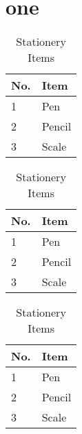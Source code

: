 \documentclass{article}
\begin{document}
	\tableofcontents
	\listoftables
	
	\section{one}
	\lipsum[1-2]
	
	\begin{table}
		\centering
		\begin{tabular}{|l|l|}
			\hline
			No. & Item\\
			\hline
			1 & Pen\\
			\hline
			2 & Pencil\\
			\hline
			3 & Scale\\
			\hline
		\end{tabular}
		\caption{Stationery Items}
	\end{table}

	\begin{table}[h] %
		\centering
		\begin{tabular}{|l|l|}
			\hline
			No. & Item\\
			\hline
			1 & Pen\\
			\hline
			2 & Pencil\\
			\hline
			3 & Scale\\
			\hline
		\end{tabular}
		\caption{Stationery Items}
	\end{table}

	\begin{table}[b] %
		\centering
		\begin{tabular}{|l|l|}
			\hline
			No. & Item\\
			\hline
			1 & Pen\\
			\hline
			2 & Pencil\\
			\hline
			3 & Scale\\
			\hline
		\end{tabular}
		\caption{Stationery Items}
	\end{table}
\end{document}
